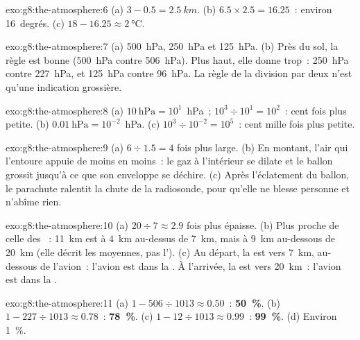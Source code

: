 \begin{solution}{exo:g8:the-atmosphere:6}
(a) $3 - 0.5 = \qty{2.5}{km}$. (b) $6.5 \times 2.5 = 16.25$~: environ
16~degrés. (c) $18 - 16.25 \approx \qty{2}{\degreeCelsius}$.
\end{solution}

\begin{solution}{exo:g8:the-atmosphere:7}
(a) \qty{500}{hPa}, \qty{250}{hPa} et \qty{125}{hPa}. (b) Près du sol, la
règle est bonne (\qty{500}{hPa} contre \qty{506}{hPa}). Plus haut, elle
donne trop~: \qty{250}{hPa} contre \qty{227}{hPa}, et \qty{125}{hPa}
contre \qty{96}{hPa}. La règle de la division par deux n'est qu'une
indication grossière.
\end{solution}

\begin{solution}{exo:g8:the-atmosphere:8}
(a) $10~\text{hPa} = 10^1$~hPa~; $10^3 \div 10^1 = 10^2$~: cent fois plus
petite. (b) $0.01~\text{hPa} = 10^{-2}$~hPa. (c) $10^3 \div 10^{-2} =
10^5$~: cent mille fois plus petite.
\end{solution}

\begin{solution}{exo:g8:the-atmosphere:9}
(a) $6 \div 1.5 = 4$ fois plus large. (b) En montant, l'air qui l'entoure
appuie de moins en moins~: le gaz à l'intérieur se dilate et le ballon
grossit jusqu'à ce que son enveloppe se déchire. (c) Après l'éclatement du
ballon, le parachute ralentit la chute de la radiosonde, pour qu'elle ne
blesse personne et n'abîme rien.
\end{solution}

\begin{solution}{exo:g8:the-atmosphere:10}
(a) $20 \div 7 \approx 2.9$ fois plus épaisse. (b) Plus proche de celle
des ~: \qty{11}{km} est à \qty{4}{km} au-dessus de \qty{7}{km}, mais à \qty{9}{km} au-dessous de \qty{20}{km} (elle décrit les  moyennes, pas l').
(c) Au départ, la  est vers \qty{7}{km}, au-dessous de
l'avion~: l'avion est dans la . À l'arrivée, la  est
vers \qty{20}{km}~: l'avion est dans la .
\end{solution}

\begin{solution}{exo:g8:the-atmosphere:11}
(a) $1 - 506 \div 1013 \approx 0.50$~: \textbf{50~\%}. (b) $1 - 227 \div
1013 \approx 0.78$~: \textbf{78~\%}. (c) $1 - 12 \div 1013 \approx 0.99$~:
\textbf{99~\%}. (d) Environ 1~\%.
\end{solution}

